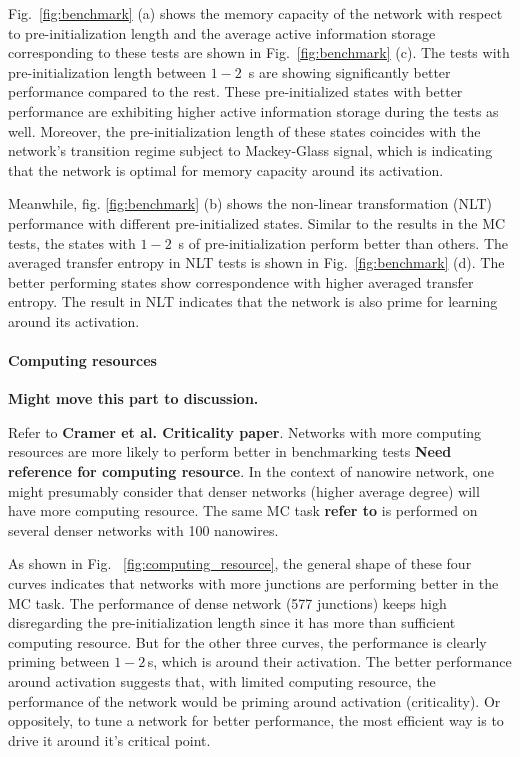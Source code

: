 \documentclass[fleqn,10pt,  reprint, amsmath,amssymb,aps, floatfix]{wlscirep}
\begin{document}
Fig.~\ref{fig:benchmark} (a) shows the memory capacity of the network with respect to pre-initialization length and the average active information storage corresponding to these tests are shown in Fig.~\ref{fig:benchmark} (c). The tests with pre-initialization length between $1-2 \,$ s are showing significantly better performance compared to the rest. These pre-initialized states with better performance are exhibiting higher active information storage during the tests as well. Moreover, the pre-initialization length of these states coincides with the network's transition regime subject to Mackey-Glass signal, which is indicating that the network is optimal for memory capacity around its activation.

Meanwhile, fig. \ref{fig:benchmark} (b) shows the non-linear transformation (NLT) performance with different pre-initialized states. Similar to the results in the MC tests, the states with $1-2 \,$ s of pre-initialization perform better than others. The averaged transfer entropy in NLT tests is shown in Fig.~\ref{fig:benchmark} (d). The better performing states show correspondence with higher averaged transfer entropy. The result in NLT indicates that the network is also prime for learning around its activation.


\paragraph{Computing resources} \textbf{Might move this part to discussion.}

Refer to \textbf{Cramer et al. Criticality paper}. Networks with more computing resources are more likely to perform better in benchmarking tests \textbf{Need reference for computing resource}. In the context of nanowire network, one might presumably consider that denser networks (higher average degree) will have more computing resource. The same MC task \textbf{refer to }is performed on several denser networks with 100 nanowires. 

As shown in Fig.~ \ref{fig:computing_resource}, the general shape of these four curves indicates that networks with more junctions are performing better in the MC task. The performance of dense network (577 junctions) keeps high disregarding the pre-initialization length since it has more than sufficient computing resource. But for the other three curves, the performance is clearly priming between $1-2 \,$s, which is around their activation. The better performance around activation suggests that, with limited computing resource, the performance of the network would be priming around activation (criticality). Or oppositely, to tune a network for better performance, the most efficient way is to drive it around it's critical point.
\end{document}
